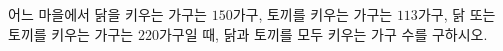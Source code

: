 어느 마을에서 닭을 키우는 가구는 $150$가구, 토끼를 키우는 가구는 $113$가구, 닭 또는 토끼를 키우는 가구는 $220$가구일 때, 닭과 토끼를 모두 키우는 가구 수를 구하시오.
